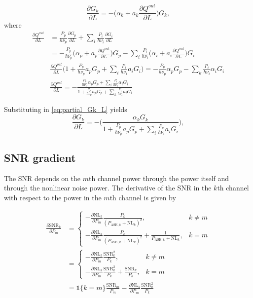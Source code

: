 \documentclass[a4paper]{article}
\begin{document}
\begin{equation} \label{eq:partial_Gk_L}
	\frac{\partial G_k}{\partial L} = -\Big(\alpha_k + a_k\frac{\partial Q^{out}}{\partial L}\Big)G_k,
\end{equation}
where
\begin{align} \nonumber
	\frac{\partial Q^{out}}{\partial L} &= \frac{P_p}{h\nu_p}\frac{\partial G_p}{\partial L} + \sum_{i}\frac{P_i}{h\nu_i}\frac{\partial G_i}{\partial L}  \\ \nonumber
	&=-\frac{P_p}{h\nu_p}\Big(\alpha_p + a_p\frac{\partial Q^{out}}{\partial L}\Big)G_p - \sum_{i}\frac{P_i}{h\nu_i}\Big(\alpha_i + a_i\frac{\partial Q^{out}}{\partial L}\Big)G_i \\ \nonumber
	&\frac{\partial Q^{out}}{\partial L}\bigg(1 + \frac{P_p}{h\nu_p}a_pG_p + \sum_{i}\frac{P_i}{h\nu_i}a_iG_i\bigg) = -\frac{P_p}{h\nu_p}\alpha_pG_p -  \sum_{k}\frac{P_i}{h\nu_i}\alpha_iG_i \\ 
	&\frac{\partial Q^{out}}{\partial L} = -\frac{\frac{P_p}{h\nu_p}\alpha_pG_p +  \sum_{i}\frac{P_i}{h\nu_i}\alpha_iG_i }{1 + \frac{P_p}{h\nu_p}a_pG_p + \sum_{k}\frac{P_i}{h\nu_i}a_iG_i}
\end{align}

Substituting in \eqref{eq:partial_Gk_L} yields
\begin{equation} 
\frac{\partial G_k}{\partial L} = -\bigg(\frac{\alpha_kG_k}{1 + \frac{P_p}{h\nu_p}a_pG_p + \sum_{i}\frac{P_k}{h\nu_i}a_iG_i}\bigg),
\end{equation}

\subsection{SNR gradient}
The SNR depends on the $m$th channel power through the power itself and through the nonlinear noise power. The derivative of the SNR in the $k$th channel with respect to the power in the $m$th channel is given by

\begin{align}
	\frac{\partial\mathrm{SNR}_k}{\partial P_m} &= \begin{cases}
	-\frac{\partial \mathrm{NL}_k}{\partial P_m}\frac{P_k}{(P_{\text{ASE}, k} + \mathrm{NL}_k)^2}, & k \neq m \\
	-\frac{\partial \mathrm{NL}_k}{\partial P_m}\frac{P_k}{(P_{\text{ASE}, k} + \mathrm{NL}_k)^2} + \frac{1}{P_{\text{ASE}, k} + \mathrm{NL}_k}, & k = m
	\end{cases} \\
	&= \begin{cases}
	-\frac{\partial \mathrm{NL}_k}{\partial P_m}\frac{\mathrm{SNR}_k^2}{P_k}, & k \neq m \\
	-\frac{\partial \mathrm{NL}_k}{\partial P_m}\frac{\mathrm{SNR}_k^2}{P_k} + \frac{\mathrm{SNR}_k}{P_k}, & k = m
	\end{cases} \\
	& = \mathds{1}\{k= m\}\frac{\mathrm{SNR}_m}{P_m} - \frac{\partial \mathrm{NL}_k}{\partial P_m}\frac{\mathrm{SNR}_k^2}{P_k}
\end{align}
\end{document}
